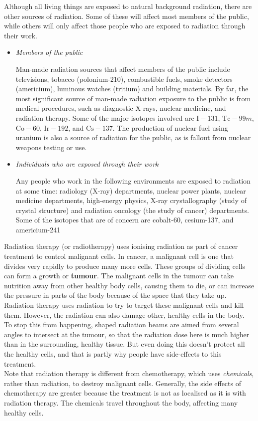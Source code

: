 Although all living things are exposed to natural background radiation, there are other sources of radiation. Some of these will affect most members of the public, while others will only affect those people who are exposed to radiation through their work.

\begin{itemize}
\item{\textit{Members of the public}

Man-made radiation sources that affect members of the public include televisions, tobacco (polonium-210), combustible fuels, smoke detectors (americium), luminous watches (tritium) and building materials. By far, the most significant source of man-made radiation exposure to the public is from medical procedures, such as diagnostic X-rays, nuclear medicine, and radiation therapy. Some of the major isotopes involved are $\text{I}-131$, $\text{Tc}-99m$, $\text{Co}-60$, $\text{Ir}-192$, and $\text{Cs}-137$. The production of nuclear fuel using uranium is also a source of radiation for the public, as is fallout from nuclear weapons testing or use.
}
\item{\textit{Individuals who are exposed through their work}

Any people who work in the following environments are exposed to radiation at some time: radiology (X-ray) departments, nuclear power plants, nuclear medicine departments, high-energy physics, X-ray crystallography (study of crystal structure) and radiation oncology (the study of cancer) departments. Some of the isotopes that are of concern are cobalt-60, cesium-137, and americium-241}
\end{itemize}



\begin{IFact}{
Radiation therapy (or radiotherapy) uses ionising radiation as part of cancer treatment to control malignant cells. In cancer, a malignant cell is one that divides very rapidly to produce many more cells. These groups of dividing cells can form a growth or \textbf{tumour}. The malignant cells in the tumour can take nutrition away from other healthy body cells, causing them to die, or can increase the pressure in parts of the body because of the space that they take up. Radiation therapy uses radiation to try to target these malignant cells and kill them. However, the radiation can also damage other, healthy cells in the body. To stop this from happening, shaped radiation beams are aimed from several angles to intersect at the tumour, so that the radiation dose here is much higher than in the surrounding, healthy tissue. But even doing this doesn't protect all the healthy cells, and that is partly why people have side-effects to this treatment. \\

Note that radiation therapy is different from chemotherapy, which uses \textit{chemicals}, rather than radiation, to destroy malignant cells. Generally, the side effects of chemotherapy are greater because the treatment is not as localised as it is with radiation therapy. The chemicals travel throughout the body, affecting many healthy cells.
}
\end{IFact}
\


